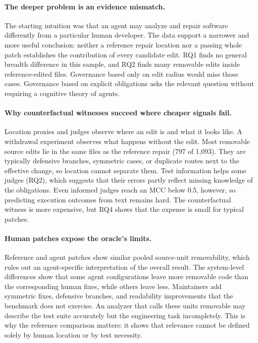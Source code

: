 \documentclass[a4paper,fleqn]{cas-sc}
\begin{document}
\paragraph{The deeper problem is an evidence mismatch.}
The starting intuition was that an agent may analyze and repair software differently from a particular human developer. The data support a narrower and more useful conclusion: neither a reference repair location nor a passing whole patch establishes the contribution of every candidate edit. RQ1 finds no general breadth difference in this sample, and RQ2 finds many removable edits inside reference-edited files. Governance based only on edit radius would miss those cases. Governance based on explicit obligations asks the relevant question without requiring a cognitive theory of agents.

\paragraph{Why counterfactual witnesses succeed where cheaper signals fail.}
Location proxies and judges observe where an edit is and what it looks like. A withdrawal experiment observes what happens without the edit. Most removable source edits lie in the same files as the reference repair (797 of 1,093). They are typically defensive branches, symmetric cases, or duplicate routes next to the effective change, so location cannot separate them. Test information helps some judges (RQ2), which suggests that their errors partly reflect missing knowledge of the obligations. Even informed judges reach an MCC below 0.5, however, so predicting execution outcomes from text remains hard. The counterfactual witness is more expensive, but RQ4 shows that the expense is small for typical patches.

\paragraph{Human patches expose the oracle's limits.}
Reference and agent patches show similar pooled source-unit removability, which rules out an agent-specific interpretation of the overall result. The system-level differences show that some agent configurations leave more removable code than the corresponding human fixes, while others leave less. Maintainers add symmetric fixes, defensive branches, and readability improvements that the benchmark does not exercise. An analyzer that calls these units removable may describe the test suite accurately but the engineering task incompletely. This is why the reference comparison matters: it shows that relevance cannot be defined solely by human location or by test necessity.
\end{document}
